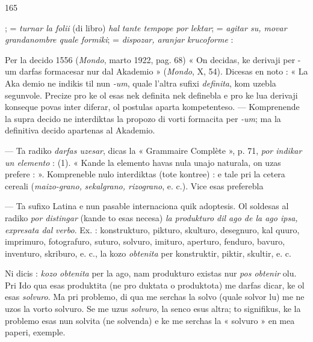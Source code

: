 \begin{VUpage}[169]{165}

\VUcontinue
{};  = \textit{turnar la folii} (di libro) \textit{hal}\cc
\textit{tante tempope por lektar};  = \textit{agitar su, movar}\nl
\textit{grandanombre quale formiki};  = \textit{dispozar, aranjar}\nl
\textit{krucoforme} : \nl
{}

Per la decido 1556 (\textit{Mondo}, marto 1922, pag. 68) « On\nl
decidas, ke derivaji per -um darfas formacesar nur dal\nl
Akademio » (\textit{Mondo}, X, 54). Dicesas en noto : « La Aka\cc
demio ne indikis til nun \textit{-um}, quale l'altra sufixi \textit{definita},\nl
kom uzebla segunvole. Precize pro ke ol esas nek definita\nl
nek definebla e pro ke lua derivaji konseque povas inter\cc
diferar, ol postulas aparta kompetenteso. --- Komprenende\nl
la supra decido ne interdiktas la propozo di vorti formacita\nl
per \textit{-um}; ma la definitiva decido apartenas al Akademio.

 --- Ta radiko \textit{darfas uzesar}, dicas la « Grammaire\nl
Complète », p. 71, \textit{por indikar un elemento} : \cc
{} (1). « Kande la elemento havas nula unajo naturala,\nl
on uzas prefere  :  ». Kompreneble\nl
nulo interdiktas (tote kontree) : \nl
{} e tale pri la cetera cereali (\textit{maizo-grano,}\nl
\textit{sekalgrano, rizograno}, e. c.). Vice  esas preferebla\nl
{}

 --- Ta sufixo Latina e nun pasable internaciona quik\nl
adoptesis. Ol soldesas al radiko \textit{por distingar} (kande to esas\nl
necesa) \textit{la produkturo dil ago de la ago ipsa, expresata dal}\nl
\textit{verbo}. Ex. : konstrukturo, pikturo, skulturo, desegnuro, kal\cc
quuro, imprimuro, fotografuro, suturo, solvuro, imituro,\nl
aperturo, fenduro, bavuro, inventuro, skriburo, e. c., la kozo\nl
\textit{obtenita} per konstruktir, piktir, skultir, e. c.

Ni dicis : \textit{kozo obtenita} per la ago, nam produkturo existas\nl
nur \textit{pos obtenir} olu. Pri Ido qua esas produktita (ne pro\cc
duktata o produktota) me darfas dicar, ke ol esas \textit{solvuro}. Ma\nl
pri problemo, di qua me serchas la solvo (quale solvor lu) me\nl
ne uzos la vorto solvuro. Se me uzus \textit{solvuro}, la senco esus\nl
altra; to signifikus, ke la problemo esas nun solvita (ne\nl
solvenda) e ke me serchas la « solvuro » en mea paperi,\nl
exemple.
\end{VUpage}

